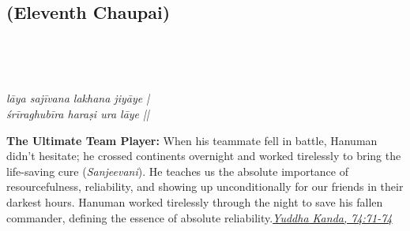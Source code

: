\subsection*{ (Eleventh Chaupai)}

\begin{minipage}[t]{0.55\textwidth}
\vspace{0pt}

{\large \linespread{1.5}\selectfont
{}\\
\par}

\vspace{0.5em}

{\large \linespread{1.5}\selectfont
{}\\
\par}

\vspace{0.5em}

{\large \linespread{1.3}\selectfont
\textit{lāya sajīvana lakhana jiyāye |}\\
\textit{śrīraghubīra haraṣi ura lāye ||}
\par}
\end{minipage}%
\hfill
\begin{minipage}[t]{0.42\textwidth}
\vspace{0pt}
\begin{tcolorbox}[anchorbox]
\textbf{The Ultimate Team Player:} When his teammate fell in battle, Hanuman didn't hesitate; he crossed continents overnight and worked tirelessly to bring the life-saving cure (\textit{Sanjeevani}). He teaches us the absolute importance of resourcefulness, reliability, and showing up unconditionally for our friends in their darkest hours.
\vspace{0.5em}\newline Hanuman worked tirelessly through the night to save his fallen commander, defining the essence of absolute reliability.\newline\null\hfill\href{https://www.valmiki.iitk.ac.in/sloka?field_kanda_tid=6&language=dv&field_sarga_value=74}{\textit{Yuddha Kanda, 74:71-74}}
\end{tcolorbox}
\end{minipage}

\vspace{0.5em}
